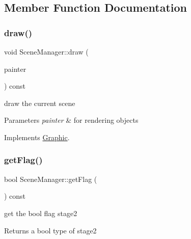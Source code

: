 \subsection{Member Function Documentation}
\mbox{\label{class_scene_manager_a1acae2e8e78a37c3cb17c5d90a5882ca}} 
\subsubsection{\texorpdfstring{draw()}{draw()}}
{\footnotesize\ttfamily void Scene\+Manager\+::draw (\begin{DoxyParamCaption}\item[{Q\+Painter \&}]{painter }\end{DoxyParamCaption}) const\hspace{0.3cm}{\ttfamily [virtual]}}



draw the current scene 


\begin{DoxyParams}{Parameters}
{\em painter} & for rendering objects \\
\hline
\end{DoxyParams}


Implements \mbox{\hyperlink{class_graphic_aed0af75ae3756baeb3fe663ae5f36f29}{Graphic}}.

\mbox{\label{class_scene_manager_a425e6d6cae2f7f902027b8a8cba28d0a}} 
\subsubsection{\texorpdfstring{get\+Flag()}{getFlag()}}
{\footnotesize\ttfamily bool Scene\+Manager\+::get\+Flag (\begin{DoxyParamCaption}{ }\end{DoxyParamCaption}) const}



get the bool flag stage2 

\begin{DoxyReturn}{Returns}
a bool type of stage2 
\end{DoxyReturn}
\mbox{\label{class_scene_manager_a543db38edb424561aa3f0d845ed5c32a}} 
